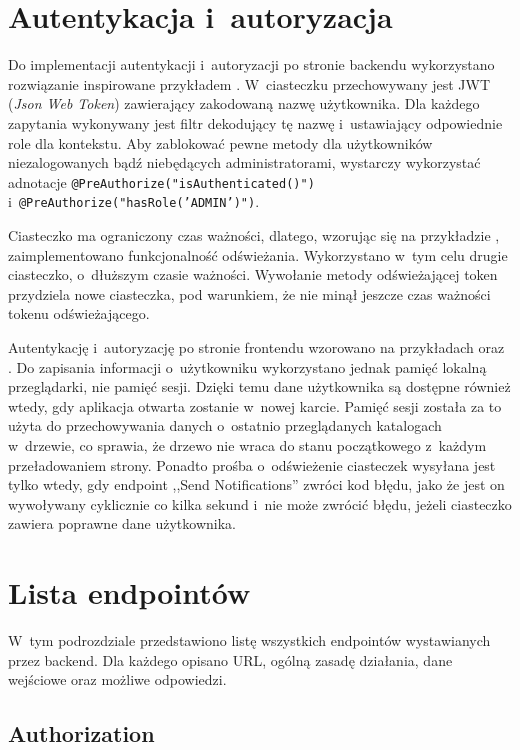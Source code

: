 \documentclass[a4paper,twoside,12pt]{book}
\newcommand{\obcy}[1]{\emph{#1}}
\newcommand{\english}[1]{{\selectlanguage{british}\obcy{#1}}}
\begin{document}
\section{Autentykacja i~autoryzacja}

Do implementacji autentykacji i~autoryzacji po stronie backendu wykorzystano rozwiązanie inspirowane przykładem \cite{bib:bkspringauth}. W~ciasteczku przechowywany jest JWT (\english{Json Web Token}) zawierający zakodowaną nazwę użytkownika. Dla każdego zapytania wykonywany jest filtr dekodujący tę nazwę i~ustawiający odpowiednie role dla kontekstu. Aby zablokować pewne metody dla użytkowników niezalogowanych bądź niebędących administratorami, wystarczy wykorzystać adnotacje \texttt{@PreAuthorize("isAuthenticated()")} i~\texttt{@PreAuthorize("hasRole('ADMIN')")}. 

Ciasteczko ma ograniczony czas ważności, dlatego, wzorując się na przykładzie \cite{bib:bkspringrefresh}, zaimplementowano funkcjonalność odświeżania. Wykorzystano w~tym celu drugie ciasteczko, o~dłuższym czasie ważności. Wywołanie metody odświeżającej token przydziela nowe ciasteczka, pod warunkiem, że nie minął jeszcze czas ważności tokenu odświeżającego.

Autentykację i~autoryzację po stronie frontendu wzorowano na przykładach \cite{bib:bkangularauth} oraz \cite{bib:bkangularrefresh}. Do zapisania informacji o~użytkowniku wykorzystano jednak pamięć lokalną przeglądarki, nie pamięć sesji. Dzięki temu dane użytkownika są dostępne również wtedy, gdy aplikacja otwarta zostanie w~nowej karcie. Pamięć sesji została za to użyta do przechowywania danych o~ostatnio przeglądanych katalogach w~drzewie, co sprawia, że drzewo nie wraca do stanu początkowego z~każdym przeładowaniem strony. Ponadto prośba o~odświeżenie ciasteczek wysyłana jest tylko wtedy, gdy endpoint ,,Send Notifications'' zwróci kod błędu, jako że jest on wywoływany cyklicznie co kilka sekund i~nie może zwrócić błędu, jeżeli ciasteczko zawiera poprawne dane użytkownika.

\section{Lista endpointów}
\label{sec:lista-endpointow}
W~tym podrozdziale przedstawiono listę wszystkich endpointów wystawianych przez backend. Dla każdego opisano URL, ogólną zasadę działania, dane wejściowe oraz możliwe odpowiedzi.

\subsection{Authorization}
\end{document}
